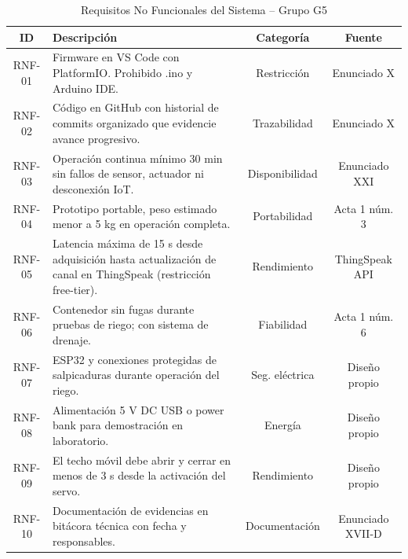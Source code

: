 \begin{table}[tp]
\centering
\renewcommand{\arraystretch}{1.3}
\caption{Requisitos No Funcionales del Sistema -- Grupo G5}
\label{tab:rnf_proyectofinal}
\begin{tabularx}{\textwidth}{|c|X|c|c|}
\hline
\textbf{ID} & \textbf{Descripción} & \textbf{Categoría} & \textbf{Fuente} \\
\hline
RNF-01 & Firmware en VS Code con PlatformIO. Prohibido .ino y Arduino IDE. & Restricción & Enunciado X \\
\hline
RNF-02 & Código en GitHub con historial de commits organizado que evidencie avance progresivo. & Trazabilidad & Enunciado X \\
\hline
RNF-03 & Operación continua mínimo 30 min sin fallos de sensor, actuador ni desconexión IoT. & Disponibilidad & Enunciado XXI \\
\hline
RNF-04 & Prototipo portable, peso estimado menor a 5 kg en operación completa. & Portabilidad & Acta 1 núm. 3 \\
\hline
RNF-05 & Latencia máxima de 15 s desde adquisición hasta actualización de canal en ThingSpeak (restricción free-tier). & Rendimiento & ThingSpeak API \\
\hline
RNF-06 & Contenedor sin fugas durante pruebas de riego; con sistema de drenaje. & Fiabilidad & Acta 1 núm. 6 \\
\hline
RNF-07 & ESP32 y conexiones protegidas de salpicaduras durante operación del riego. & Seg. eléctrica & Diseño propio \\
\hline
RNF-08 & Alimentación 5 V DC USB o power bank para demostración en laboratorio. & Energía & Diseño propio \\
\hline
RNF-09 & El techo móvil debe abrir y cerrar en menos de 3 s desde la activación del servo. & Rendimiento & Diseño propio \\
\hline
RNF-10 & Documentación de evidencias en bitácora técnica con fecha y responsables. & Documentación & Enunciado XVII-D \\
\hline
\end{tabularx}
\end{table}